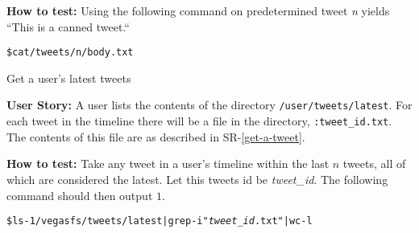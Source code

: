 \begin{Requirements}
\textbf{How to test:} Using the following command on predetermined tweet
\textit{n} yields ``This is a canned tweet.``

\begin{alltt}
    \$ cat /tweets/n/body.txt
\end{alltt}


% 
 

\item Get a user's latest tweets

\textbf{User Story:} A user lists the contents of the directory
\texttt{/user/tweets/latest}. For each tweet in the timeline there will be a
file in the directory, \texttt{:tweet\_id.txt}. The contents of this file are as
described in SR-\ref{get-a-tweet}.

\textbf{How to test:} Take any tweet in a user's timeline within the last $n$
tweets, all of which are considered the latest. Let this tweets id be
\textit{tweet\_id}. The following command should then output $1$.

\begin{alltt}
    \$ ls -1 /vegasfs/tweets/latest | grep -i "\textit{tweet\_id}.txt" | wc -l
\end{alltt}

% 
% 
% 


\end{Requirements}
